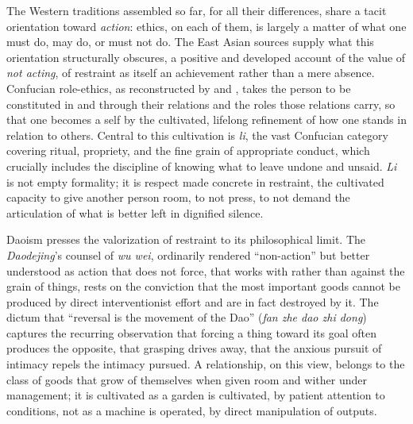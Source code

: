 \documentclass[11pt,a4paper]{article}
\begin{document}
The Western traditions assembled so far, for all their differences, share a tacit orientation toward \emph{action}: ethics, on each of them, is largely a matter of what one must do, may do, or must not do. The East Asian sources supply what this orientation structurally obscures, a positive and developed account of the value of \emph{not acting}, of restraint as itself an achievement rather than a mere absence. Confucian role-ethics, as reconstructed by \textcite{ames2011confucian} and \textcite{tu1985confucian}, takes the person to be constituted in and through their relations and the roles those relations carry, so that one becomes a self by the cultivated, lifelong refinement of how one stands in relation to others. Central to this cultivation is \emph{li}, the vast Confucian category covering ritual, propriety, and the fine grain of appropriate conduct, which crucially includes the discipline of knowing what to leave undone and unsaid. \emph{Li} is not empty formality; it is respect made concrete in restraint, the cultivated capacity to give another person room, to not press, to not demand the articulation of what is better left in dignified silence.

Daoism presses the valorization of restraint to its philosophical limit. The \emph{Daodejing}'s counsel of \emph{wu wei}, ordinarily rendered ``non-action'' but better understood as action that does not force, that works with rather than against the grain of things, rests on the conviction that the most important goods cannot be produced by direct interventionist effort and are in fact destroyed by it. The dictum that ``reversal is the movement of the Dao'' (\emph{fan zhe dao zhi dong}) captures the recurring observation that forcing a thing toward its goal often produces the opposite, that grasping drives away, that the anxious pursuit of intimacy repels the intimacy pursued. A relationship, on this view, belongs to the class of goods that grow of themselves when given room and wither under management; it is cultivated as a garden is cultivated, by patient attention to conditions, not as a machine is operated, by direct manipulation of outputs.
\end{document}
